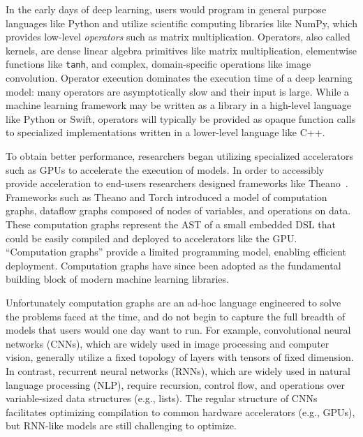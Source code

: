 In the early days of deep learning, users would program
  in general purpose languages like Python and utilize
  scientific computing libraries like NumPy,
  which provides low-level \textit{operators} such as matrix multiplication.
Operators, also called kernels,
  are dense linear algebra primitives like matrix multiplication,
  elementwise functions like \verb|tanh|, and complex,
  domain-specific operations like image convolution.
Operator execution dominates the execution time of a deep learning model: many
  operators are asymptotically slow and their input is large.
While a machine learning framework may be written as a library in a high-level language
  like Python or Swift, operators will typically be provided as opaque function calls to
  specialized implementations written in a lower-level language like C++.

To obtain better performance, researchers began utilizing specialized
  accelerators such as GPUs to accelerate the execution of models.
In order to accessibly provide acceleration to end-users
  researchers designed frameworks like Theano~\cite{theano}.
Frameworks such as Theano and Torch introduced a model of
  computation graphs, dataflow graphs composed of nodes of
    variables, and operations on data.
These computation graphs represent the AST of a small
  embedded DSL that could be easily compiled and deployed
  to accelerators like the GPU.
``Computation graphs'' provide a limited programming model,
    enabling efficient deployment.
Computation graphs have since been adopted as the fundamental building block of modern
    machine learning libraries.

Unfortunately computation graphs are an ad-hoc language engineered to solve
  the problems faced at the time, and do not begin to capture the full breadth
  of models that users would one day want to run.
For example,
  convolutional neural networks (CNNs),
  which are widely used in image processing and computer vision,
  generally utilize a fixed topology of layers
  with tensors of fixed dimension.
In contrast,
  recurrent neural networks (RNNs),
  which are widely used in natural language processing (NLP),
  require recursion, control flow, and
  operations over variable-sized data structures (e.g., lists).
The regular structure of CNNs facilitates
  optimizing compilation to
  common hardware accelerators (e.g., GPUs), but
  RNN-like models are still challenging to optimize.

